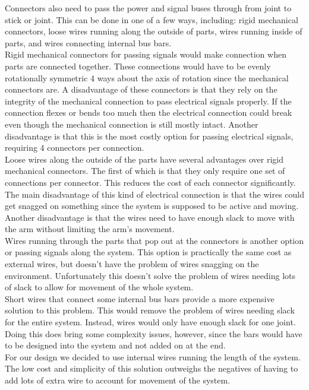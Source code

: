 Connectors also need to pass the power and signal buses through from joint to stick or joint. This can be done in one of a few ways, including: rigid mechanical connectors, loose wires running along the outside of parts, wires running inside of parts, and wires connecting internal bus bars. \\
\newline
Rigid mechanical connectors for passing signals would make connection when parts are connected together. These connections would have to be evenly rotationally symmetric 4 ways about the axis of rotation since the mechanical connectors are. A disadvantage of these connectors is that they rely on the integrity of the mechanical connection to pass electrical signals properly. If the connection flexes or bends too much then the electrical connection could break even though the mechanical connection is still mostly intact. Another disadvantage is that this is the most costly option for passing electrical signals, requiring 4 connectors per connection. \\
\newline
Loose wires along the outside of the parts have several advantages over rigid mechanical connectors. The first of which is that they only require one set of connections per connector. This reduces the cost of each connector significantly. The main disadvantage of this kind of electrical connection is that the wires could get snagged on something since the system is supposed to be active and moving. Another disadvantage is that the wires need to have enough slack to move with the arm without limiting the arm's movement.  \\
\newline
Wires running through the parts that pop out at the connectors is another option or passing signals along the system. This option is practically the same cost as external wires, but doesn't have the problem of wires snagging on the environment. Unfortunately this doesn't solve the problem of wires needing lots of slack to allow for movement of the whole system. \\
\newline
Short wires that connect some internal bus bars provide a more expensive solution to this problem. This would remove the problem of wires needing slack for the entire system. Instead, wires would only have enough slack for one joint. Doing this does bring some complexity issues, however, since the bars would have to be designed into the system and not added on at the end. \\
\newline
For our design we decided to use internal wires running the length of the system. The low cost and simplicity of this solution outweighs the negatives of having to add lots of extra wire to account for movement of the system.\\

